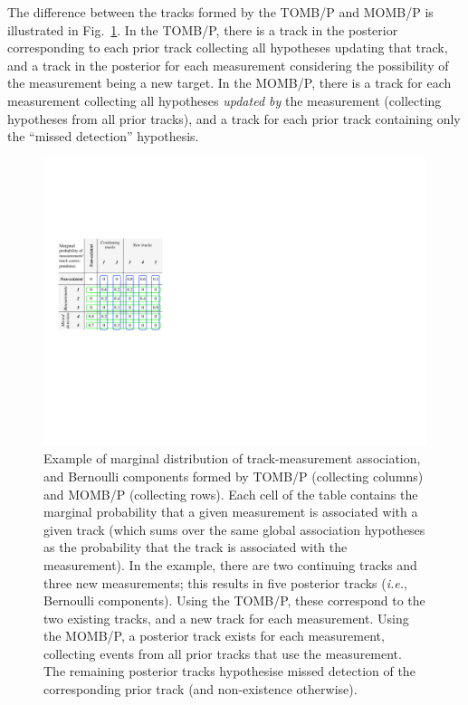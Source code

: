 \documentclass[journal,twoside]{IEEEtran}
\theoremstyle{plain}
\begin{document}
The difference between the tracks formed by the TOMB/P and MOMB/P is illustrated in Fig.~\ref{fig:MarginalSlicing}. In the TOMB/P, there is a track in the posterior corresponding to each prior track collecting all hypotheses updating that track, and a track in the posterior for each measurement considering the possibility of the measurement being a new target. In the MOMB/P, there is a track for each measurement collecting all hypotheses \emph{updated by} the measurement (collecting hypotheses from all prior tracks), and a track for each prior track containing only the ``missed detection'' hypothesis.


\begin{figure}[tb]
\centering
\includegraphics{figure3.pdf} %
\caption{Example of marginal distribution of track-measurement association, and Bernoulli components formed by {\color{blue}TOMB/P} (collecting columns) and {\color{green}MOMB/P} (collecting rows). Each cell of the table contains the marginal probability that a given measurement is associated with a given track (which sums over the same global association hypotheses as the probability that the track is associated with the measurement). In the example, there are two continuing tracks and three new measurements; this results in five posterior tracks (\textit{i.e.}\xspace, Bernoulli components). Using the TOMB/P, these correspond to the two existing tracks, and a new track for each measurement. Using the MOMB/P, a posterior track exists for each measurement, collecting events from all prior tracks that use the measurement. The remaining posterior tracks hypothesise missed detection of the corresponding prior track (and non-existence otherwise).}
\label{fig:MarginalSlicing}
\end{figure}
\end{document}
